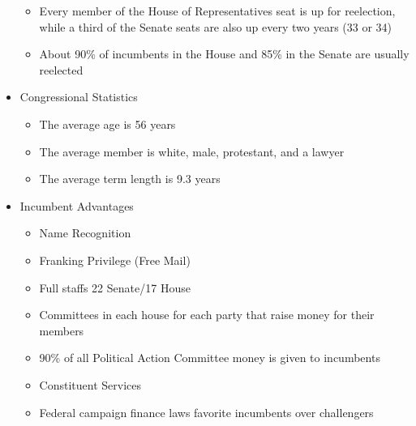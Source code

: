 \documentclass[12pt]{article}
\begin{document}
\begin{itemize}
    \begin{itemize}

      \item Every member of the House of Representatives seat is up for reelection, while a third of the Senate seats are also up every two years (33 or 34)

      \item About 90\% of incumbents in the House and 85\% in the Senate are usually reelected

    \end{itemize}

  \item Congressional Statistics

    \begin{itemize}

      \item The average age is 56 years

      \item The average member is white, male, protestant, and a lawyer

      \item The average term length is 9.3 years

    \end{itemize}

  \item Incumbent Advantages

    \begin{itemize}

      \item Name Recognition

      \item Franking Privilege (Free Mail)

      \item Full staffs 22 Senate/17 House

      \item Committees in each house for each party that raise money for their members

      \item 90\% of all Political Action Committee money is given to incumbents

      \item Constituent Services

      \item Federal campaign finance laws favorite incumbents over challengers

    \end{itemize}


\end{itemize}
\end{document}
